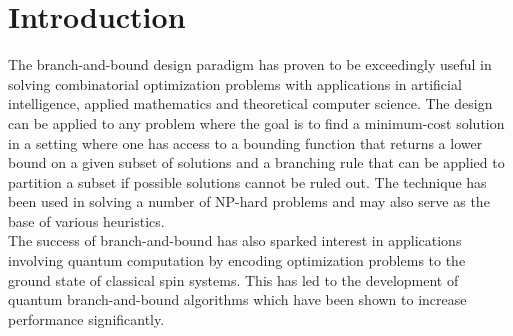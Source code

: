 
\section{Introduction}
	The branch-and-bound design paradigm has proven to be exceedingly useful in solving combinatorial optimization problems with applications in artificial intelligence, applied mathematics and theoretical computer science. 
	The design can be applied to any problem where the goal is to find a minimum-cost solution in a setting where one has access to a bounding function that returns a lower bound on a given subset of solutions and a branching rule that can be applied to partition a subset if possible solutions cannot be ruled out. 
	The technique has been used in solving a number of NP-hard problems and may also serve as the base of various heuristics.\\
	\indent
	The success of branch-and-bound has also sparked interest in applications involving quantum computation by encoding optimization problems to the ground state of classical spin systems. 
	This has led to the development of quantum branch-and-bound algorithms which have been shown to increase performance significantly. 
	
	
	